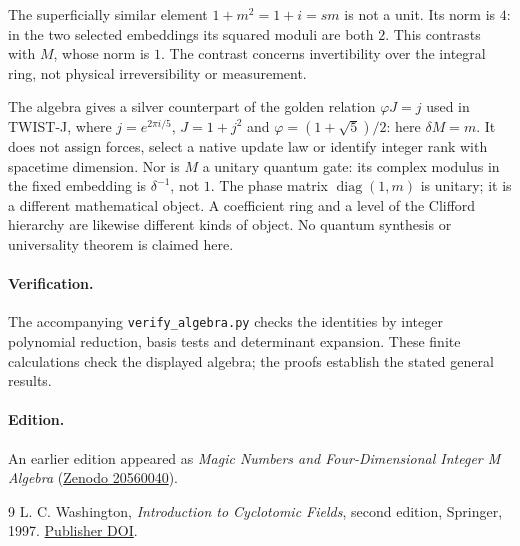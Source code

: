 \documentclass[11pt,a4paper]{article}
\begin{document}
The superficially similar element $1+m^2=1+i=sm$ is not a unit.
Its norm is $4$: in the two selected embeddings its squared moduli
are both $2$. This contrasts with $M$, whose norm is $1$.
The contrast concerns invertibility over the integral ring, not
physical irreversibility or measurement.

The algebra gives a silver counterpart of the golden relation
$\varphi J=j$ used in TWIST-J, where $j=e^{2\pi i/5}$,
$J=1+j^2$ and $\varphi=(1+\sqrt5)/2$: here $\delta M=m$.
It does not assign forces, select a native update law or identify
integer rank with spacetime dimension. Nor is $M$ a unitary quantum
gate: its complex modulus in the fixed embedding is $\delta^{-1}$,
not $1$. The phase matrix $\operatorname{diag}(1,m)$ is unitary;
it is a different mathematical object. A coefficient ring and a
level of the Clifford hierarchy are likewise different kinds of object.
No quantum synthesis or universality theorem is claimed here.

\paragraph{Verification.}
The accompanying \texttt{verify\_algebra.py} checks the identities
by integer polynomial reduction, basis tests and determinant expansion.
These finite calculations check the displayed algebra; the proofs
establish the stated general results.

\paragraph{Edition.}
An earlier edition appeared as \emph{Magic Numbers and
Four-Dimensional Integer M Algebra}
(\href{https://doi.org/10.5281/zenodo.20560040}{Zenodo 20560040}).

\begin{thebibliography}{9}
 L. C. Washington, \emph{Introduction to Cyclotomic
Fields}, second edition, Springer, 1997.
\href{https://doi.org/10.1007/978-1-4612-1934-7}{Publisher DOI}.
\end{thebibliography}
\end{document}
